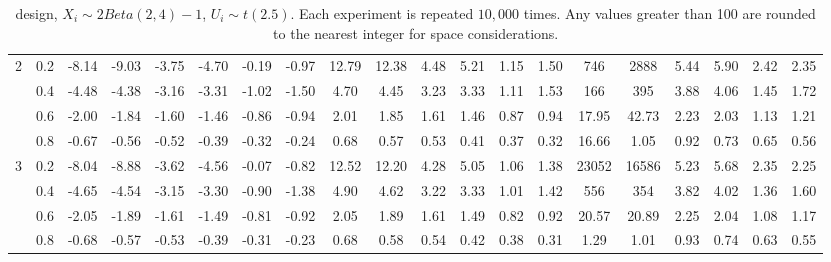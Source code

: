 \begin{table}
\begin{threeparttable}
\begin{tabular}{c c|c c c c c c|c c c c c c|c c c c c c}
\hline
\multirow{4}{*}{2} & 0.2 & -8.14 & -9.03 & -3.75 & -4.70 & -0.19 & -0.97 & 12.79 & 12.38 & 4.48 & 5.21 & 1.15 & 1.50 & 746 & 2888 & 5.44 & 5.90 & 2.42 & 2.35 \\
& 0.4 & -4.48 & -4.38 & -3.16 & -3.31 & -1.02 & -1.50 & 4.70 & 4.45 & 3.23 & 3.33 & 1.11 & 1.53 & 166 & 395 & 3.88 & 4.06 & 1.45 & 1.72 \\
& 0.6 & -2.00 & -1.84 & -1.60 & -1.46 & -0.86 & -0.94 & 2.01 & 1.85 & 1.61 & 1.46 & 0.87 & 0.94 & 17.95 & 42.73 & 2.23 & 2.03 & 1.13 & 1.21 \\
& 0.8 & -0.67 & -0.56 & -0.52 & -0.39 & -0.32 & -0.24 & 0.68 & 0.57 & 0.53 & 0.41 & 0.37 & 0.32 & 16.66 & 1.05 & 0.92 & 0.73 & 0.65 & 0.56 \\
\hline
\multirow{4}{*}{3} & 0.2 & -8.04 & -8.88 & -3.62 & -4.56 & -0.07 & -0.82 & 12.52 & 12.20 & 4.28 & 5.05 & 1.06 & 1.38 & 23052 & 16586 & 5.23 & 5.68 & 2.35 & 2.25 \\
& 0.4 & -4.65 & -4.54 & -3.15 & -3.30 & -0.90 & -1.38 & 4.90 & 4.62 & 3.22 & 3.33 & 1.01 & 1.42 & 556 & 354 & 3.82 & 4.02 & 1.36 & 1.60 \\
& 0.6 & -2.05 & -1.89 & -1.61 & -1.49 & -0.81 & -0.92 & 2.05 & 1.89 & 1.61 & 1.49 & 0.82 & 0.92 & 20.57 & 20.89 & 2.25 & 2.04 & 1.08 & 1.17 \\
& 0.8 & -0.68 & -0.57 & -0.53 & -0.39 & -0.31 & -0.23 & 0.68 & 0.58 & 0.54 & 0.42 & 0.38 & 0.31 & 1.29 & 1.01 & 0.93 & 0.74 & 0.63 & 0.55 \\
\hline
\hline
\end{tabular}
\caption*{\citet{ludwig2007does} design, $X_i \sim 2Beta(2,4) - 1$, $U_i \sim t(2.5)$. Each experiment is repeated $10,000$ times. Any values greater than 100 are rounded to the nearest integer for space considerations.}
\label{table estimation lm beta t}
\end{threeparttable}
\end{table}
